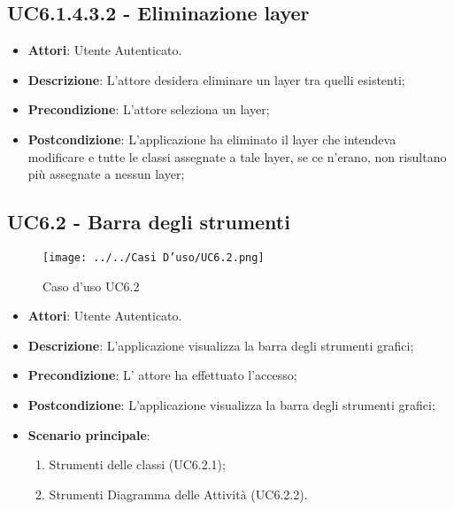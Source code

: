 \subsection{UC6.1.4.3.2 - Eliminazione layer} 
\label{ssec:UC6.1.4.3.2} 
\begin{itemize} 
\item \textbf{Attori}: Utente Autenticato.
\item \textbf{Descrizione}: L'attore desidera eliminare un layer tra quelli esistenti;
\item \textbf{Precondizione}: L'attore seleziona un layer;
\item \textbf{Postcondizione}: L'applicazione ha eliminato il layer che intendeva modificare e tutte le classi assegnate a tale layer, se ce n'erano, non risultano più assegnate a nessun layer;
\end{itemize} 
\subsection{UC6.2 - Barra degli strumenti} 
\label{ssec:UC6.2} 
\begin{figure}[h!] 
\centering 
\texttt{[image: ../../Casi D'uso/UC6.2.png]} 
\caption{Caso d'uso UC6.2} 
 \end{figure} 
\begin{itemize} 
\item \textbf{Attori}: Utente Autenticato.
\item \textbf{Descrizione}: L'applicazione visualizza la barra degli strumenti grafici;
\item \textbf{Precondizione}: L' attore ha effettuato l'accesso;
\item \textbf{Postcondizione}: L'applicazione visualizza la barra degli strumenti grafici;
\item \textbf{Scenario principale}: \begin{enumerate}\item Strumenti delle classi (UC6.2.1);\item Strumenti Diagramma delle Attività (UC6.2.2). 
 \end{enumerate}
\end{itemize} 
